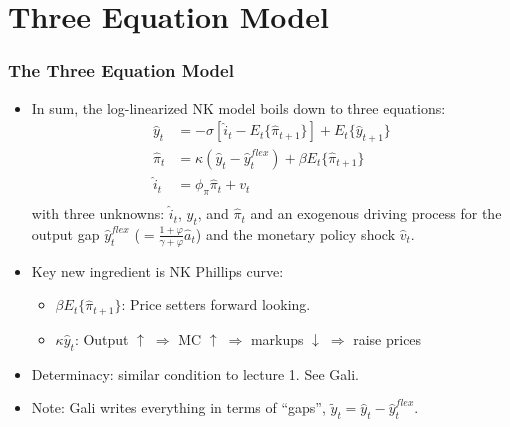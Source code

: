 \documentclass[11pt,aspectratio=169,xcolor={dvipsnames},hyperref={pdftex,pdfpagemode=UseNone,hidelinks,pdfdisplaydoctitle=true},usepdftitle=false]{beamer}
\begin{document}
\section{Three Equation Model}

\begin{frame}
\frametitle{The Three Equation Model}
\begin{itemize}
	\item In sum, the log-linearized NK model boils down to three equations:
	\begin{align*}
		\hat{y}_t &=-\sigma[\hat{i}_t-E_t\{\hat{\pi}_{t+1}\}]+E_t\{\hat{y}_{t+1}\} \\
		\hat{\pi}_t&=\kappa (\hat{y}_t-\hat{y}_t^{flex}) +\beta E_t \{\hat{\pi}_{t+1}\} \\
		\hat{i}_t&=\phi_\pi\hat{\pi}_t+v_t \\
	\end{align*}
	with three unknowns: $\hat{i}_t$, $\hat{y}_t$, and $\hat{\pi}_t$  and an exogenous driving
process for the output gap $\hat{y}_t^{flex}$ ($=\frac{1+\varphi}{\gamma+\varphi}\hat{a}_t$) and the monetary policy shock $\hat{v}_t$.
	\item Key new ingredient is NK Phillips curve:
	\begin{itemize}
		\item $\beta E_t \{\hat{\pi}_{t+1}\}$: Price setters forward looking.
		\item $\kappa\hat{y}_t$: Output  $\uparrow\;\Rightarrow$ MC $\uparrow\;\Rightarrow$ markups $\downarrow\;\Rightarrow$ raise prices
	\end{itemize}
	\item Determinacy: similar condition to lecture 1. See Gali.
	\item Note: Gali writes everything in terms of ``gaps'', $\tilde{y}_t = \hat{y}_t-\hat{y}_t^{flex}$.
\end{itemize}
\end{frame}
\end{document}
